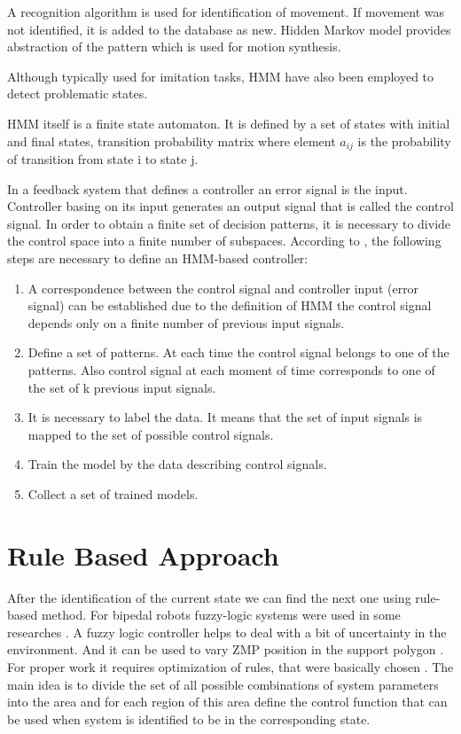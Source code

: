 \documentclass[12pt,a4paper]{report}
\begin{document}
			A recognition algorithm is used for identification of movement. If movement was not identified, it is added to the database as new. Hidden Markov model provides abstraction of the pattern which is used for motion synthesis.
			
			Although typically used for imitation tasks, HMM have also been employed to detect problematic states.
			
			HMM itself is a finite state automaton. It is defined by a set of states with initial and final states, transition probability matrix where element $a_{ij}$ is the probability of transition from state i to state j.
			
			In a feedback system that defines a controller an error signal is the input. Controller basing on its input generates an output signal that is called the control signal. In order to obtain a finite set of decision patterns, it is necessary to divide the control space into a finite number of subspaces. According to  \cite{yang1994hidden}, the following steps are necessary to define an HMM-based controller:
			
			\begin{enumerate}
				\item
					A correspondence  between the control signal and controller input (error signal) can be established due to the definition of HMM the control signal depends only on a finite number of previous input signals.
				\item 
					Define a set of patterns. At each time the control signal belongs to one of the patterns. Also control signal at each moment of time corresponds to one of the set of k previous input signals.
				\item
					It is necessary to label the data. It means that the set of input signals is mapped to the set of possible control signals.
				\item
					Train the model by the data describing control signals.
				\item
					Collect a set of trained models.
			\end{enumerate} 
			
		\section{Rule Based Approach}
			After the identification of the current state we can find the next one using rule-based method. For bipedal robots fuzzy-logic systems were used in some researches \cite{park2003fuzzy}.  A fuzzy logic controller helps to deal with a bit of uncertainty in the environment. And it can be used to vary ZMP position in the support polygon \cite{park2003fuzzy}. For proper work it requires optimization of rules, that were basically chosen \cite{vundavilli2010dynamically}.
			The main idea is to divide the set of all possible combinations of system parameters into the area and for each region of this area define the control function that can be used when system is identified to be in the corresponding state.
		
\end{document}

